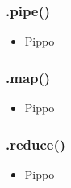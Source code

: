             \subsubsection{.pipe()}\label{subsub:pipe}

            \begin{frame}{\insertsubsectionhead}{}
                \begin{block}{\texttt{\insertsubsubsectionhead}}
                    \begin{itemize}
                        \item Pippo
                    \end{itemize}
                \end{block}
            \end{frame}

            \subsubsection{.map()}\label{subsub:map}

            \begin{frame}{\insertsubsectionhead}{}
                \begin{block}{\texttt{\insertsubsubsectionhead}}
                    \begin{itemize}
                        \item Pippo
                    \end{itemize}
                \end{block}
            \end{frame}

            \subsubsection{.reduce()}\label{subsub:reduce}

            \begin{frame}{\insertsubsectionhead}{}
                \begin{block}{\texttt{\insertsubsubsectionhead}}
                    \begin{itemize}
                        \item Pippo
                    \end{itemize}
                \end{block}
            \end{frame}

